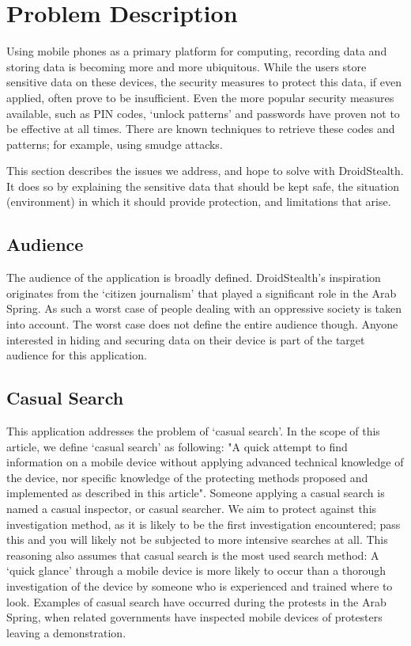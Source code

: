 \section{Problem Description}
\label{sec:problem-description}
Using mobile phones as a primary platform for computing, recording data and storing data is becoming more and more ubiquitous.
While the users store sensitive data on these devices, the security measures to protect this data, if even applied, often prove to be insufficient.
Even the more popular security measures available, such as PIN codes, `unlock patterns' and passwords have proven not to be effective at all times.
There are known techniques to retrieve these codes and patterns; for example, using smudge attacks\cite{aviv2010smudge}.

This section describes the issues we address, and hope to solve with DroidStealth.
It does so by explaining the sensitive data that should be kept safe, the situation (environment) in which it should provide protection, and limitations that arise.

\subsection{Audience}
The audience of the application is broadly defined.
DroidStealth's inspiration originates from the `citizen journalism'\cite{duffy2011} that played a significant role in the Arab Spring. 
As such a worst case of people dealing with an oppressive society is taken into account.
The worst case does not define the entire audience though.
Anyone interested in hiding and securing data on their device is part of the target audience for this application.

\subsection{Casual Search}
This application addresses the problem of `casual search'.
In the scope of this article, we define `casual search' as following: 
"A quick attempt to find information on a mobile device without applying advanced technical knowledge of the device, nor specific knowledge of the protecting methods proposed and implemented as described in this article".
Someone applying a casual search is named a casual inspector, or casual searcher.
We aim to protect against this investigation method, as it is likely to be the first investigation encountered; pass this and you will likely not be subjected to more intensive searches at all.
This reasoning also assumes that casual search is the most used search method:
A `quick glance' through a mobile device is more likely to occur than a thorough investigation of the device by someone who is experienced and trained where to look.
Examples of casual search have occurred during the protests in the Arab Spring, when related governments have inspected mobile devices of protesters leaving a demonstration.

